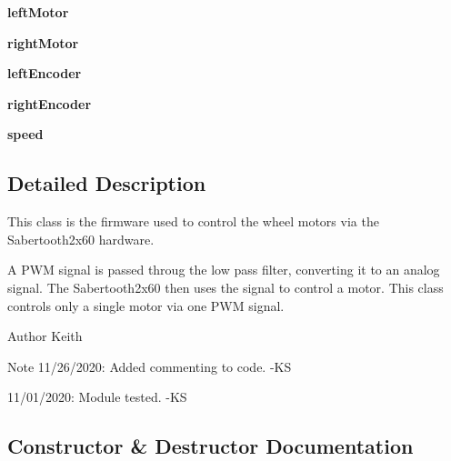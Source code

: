 \begin{DoxyCompactItemize}
{\bfseries left\+Motor}
\item 
\mbox{\label{classmcs_1_1controllers_1_1DriveControl_1_1DriveControl_a134ab0627910e01f95916c1ddb21e678}} 
{\bfseries right\+Motor}
\item 
\mbox{\label{classmcs_1_1controllers_1_1DriveControl_1_1DriveControl_a31622eb32caf4490627c7b9f465645fd}} 
{\bfseries left\+Encoder}
\item 
\mbox{\label{classmcs_1_1controllers_1_1DriveControl_1_1DriveControl_a3ec3ab2771b9d3690dad93aa9fbd2b08}} 
{\bfseries right\+Encoder}
\item 
\mbox{\label{classmcs_1_1controllers_1_1DriveControl_1_1DriveControl_a082b2438a0f6a99e8259cce06cd2b8be}} 
{\bfseries speed}
\end{DoxyCompactItemize}


\subsection{Detailed Description}
This class is the firmware used to control the wheel motors via the Sabertooth2x60 hardware. 

A P\+WM signal is passed throug the low pass filter, converting it to an analog signal. The Sabertooth2x60 then uses the signal to control a motor. This class controls only a single motor via one P\+WM signal. \begin{DoxyAuthor}{Author}
Keith 
\end{DoxyAuthor}
\begin{DoxyNote}{Note}
11/26/2020\+: Added commenting to code. -\/\+KS 

11/01/2020\+: Module tested. -\/\+KS 
\end{DoxyNote}


\subsection{Constructor \& Destructor Documentation}
\mbox{\label{classmcs_1_1controllers_1_1DriveControl_1_1DriveControl_a402c077fc5e41d37d31f4539bc8b06d5}} 
